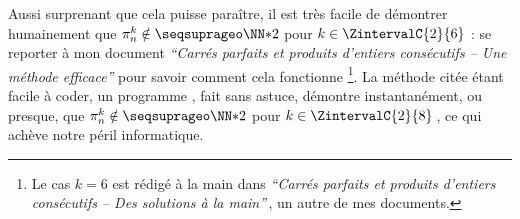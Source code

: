 \leavevmode
\smallskip

Aussi surprenant que cela puisse paraître, il est très facile de démontrer humainement que $\consprod \notin \NNssquare$ pour $k \in \ZintervalC{2}{6}$ :
se reporter à mon document \emph{\enquote{Carrés parfaits et produits d’entiers consécutifs – Une méthode efficace}} pour savoir comment cela fonctionne
\footnote{
	Le cas $k = 6$ est rédigé à la main dans \emph{\enquote{Carrés parfaits et produits d’entiers consécutifs – Des solutions à la main}}\,, un autre de mes documents.
}.
La méthode citée étant facile à coder, un programme \python, fait sans astuce, démontre instantanément, ou presque, que $\consprod \notin \NNssquare$ pour $k \in \ZintervalC{2}{8}$\,, ce qui achève notre péril informatique.